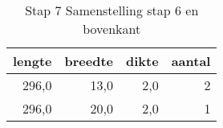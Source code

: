 \begin{table}[h!]
\centering
\caption{Stap 7 Samenstelling stap 6 en bovenkant}
\begin{tabular}{rrrr}
\toprule
 lengte &  breedte &  dikte &  aantal \\
\midrule
  296,0 &     13,0 &    2,0 &       2 \\
  296,0 &     20,0 &    2,0 &       1 \\
\bottomrule
\end{tabular}
\end{table}
